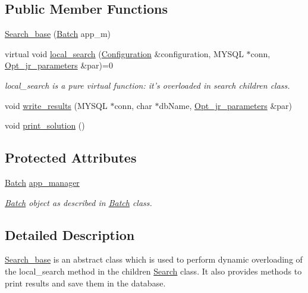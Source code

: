 \subsection*{Public Member Functions}
\begin{DoxyCompactItemize}
\item 
\hyperlink{classSearch__base_a222697de87f38891f9018defe1988dc4}{Search\-\_\-base} (\hyperlink{classBatch}{Batch} app\-\_\-m)
\item 
virtual void \hyperlink{classSearch__base_ab3730b1118efbe97065f1ea9715a90dc}{local\-\_\-search} (\hyperlink{classConfiguration}{Configuration} \&configuration, M\-Y\-S\-Q\-L $\ast$conn, \hyperlink{classOpt__jr__parameters}{Opt\-\_\-jr\-\_\-parameters} \&par)=0
\begin{DoxyCompactList}\small\item\em local\-\_\-search is a pure virtual function\-: it's overloaded in search children class. \end{DoxyCompactList}\item 
void \hyperlink{classSearch__base_a43c7b22f332c3be3ed2f6da9e2d6d3a5}{write\-\_\-results} (M\-Y\-S\-Q\-L $\ast$conn, char $\ast$db\-Name, \hyperlink{classOpt__jr__parameters}{Opt\-\_\-jr\-\_\-parameters} \&par)
\item 
void \hyperlink{classSearch__base_a6380bc5489f95cf722fa7cc329dc9f9d}{print\-\_\-solution} ()
\end{DoxyCompactItemize}
\subsection*{Protected Attributes}
\begin{DoxyCompactItemize}
\item 
\hyperlink{classBatch}{Batch} \hyperlink{classSearch__base_aee76f7ade36a2c78a486efa2715170ea}{app\-\_\-manager}
\begin{DoxyCompactList}\small\item\em \hyperlink{classBatch}{Batch} object as described in \hyperlink{classBatch}{Batch} class. \end{DoxyCompactList}\end{DoxyCompactItemize}


\subsection{Detailed Description}
\hyperlink{classSearch__base}{Search\-\_\-base} is an abstract class which is used to perform dynamic overloading of the local\-\_\-search method in the children \hyperlink{classSearch}{Search} class. It also provides methods to print results and save them in the database. 

